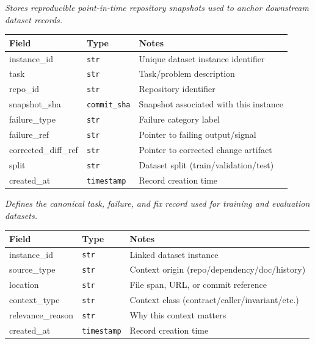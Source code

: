 \documentclass[a4paper,12pt]{article}
\begin{document}
\noindent \textit{Stores reproducible point-in-time repository snapshots used to anchor downstream dataset records.} \\

\begin{tcolorbox}[title=DatasetInstanceSchema]
\footnotesize
\begin{tabularx}{\linewidth}{@{} l l Y @{}}
\toprule
\textbf{Field} & \textbf{Type} & \textbf{Notes} \\
\midrule
instance\_id & \texttt{str} & Unique dataset instance identifier \\
task & \texttt{str} & Task/problem description \\
repo\_id & \texttt{str} & Repository identifier \\
snapshot\_sha & \texttt{commit\_sha} & Snapshot associated with this instance \\
failure\_type & \texttt{str} & Failure category label \\
failure\_ref & \texttt{str} & Pointer to failing output/signal \\
corrected\_diff\_ref & \texttt{str} & Pointer to corrected change artifact \\
split & \texttt{str} & Dataset split (train/validation/test) \\
created\_at & \texttt{timestamp} & Record creation time \\
\bottomrule
\end{tabularx}
\end{tcolorbox}

\noindent \textit{Defines the canonical task, failure, and fix record used for training and evaluation datasets.}\\ 

\begin{tcolorbox}[title=ContextLabelSchema]
\footnotesize
\begin{tabularx}{\linewidth}{@{} l l Y @{}}
\toprule
\textbf{Field} & \textbf{Type} & \textbf{Notes} \\
\midrule
instance\_id & \texttt{str} & Linked dataset instance \\
source\_type & \texttt{str} & Context origin (repo/dependency/doc/history) \\
location & \texttt{str} & File span, URL, or commit reference \\
context\_type & \texttt{str} & Context class (contract/caller/invariant/etc.) \\
relevance\_reason & \texttt{str} & Why this context matters \\
created\_at & \texttt{timestamp} & Record creation time \\
\bottomrule
\end{tabularx}
\end{tcolorbox}
\end{document}
